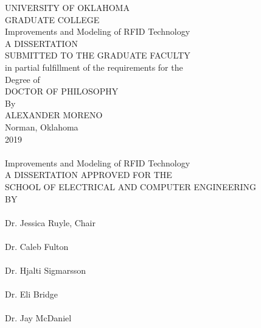 \documentclass[12pt,onecolumn]{report}
\begin{document}
\centering
UNIVERSITY OF OKLAHOMA \\
GRADUATE COLLEGE \\
\vspace{5\baselineskip}
Improvements and Modeling of RFID Technology \\
\vspace{4\baselineskip}
A DISSERTATION \\
SUBMITTED TO THE GRADUATE FACULTY \\
in partial fulfillment of the requirements for the \\
Degree of \\
DOCTOR OF PHILOSOPHY\\
\vspace{5\baselineskip}
By \\
ALEXANDER MORENO \\
Norman, Oklahoma \\
2019 \\

\clearpage
~ \\ \vspace{.5in}
Improvements and Modeling of RFID Technology  \\
\vspace{2\baselineskip}
A DISSERTATION APPROVED FOR THE \\
SCHOOL OF ELECTRICAL AND COMPUTER ENGINEERING \\
\vspace{5\baselineskip}
BY \\
\vspace{6\baselineskip}
\raggedleft
\hspace*{3in}\hrulefill \\
Dr. Jessica Ruyle, Chair \\
\vspace{3\baselineskip}
\hspace*{3in}\hrulefill \\
Dr. Caleb Fulton \\
\vspace{3\baselineskip}
\hspace*{3in}\hrulefill \\
Dr. Hjalti Sigmarsson \\
\vspace{3\baselineskip}
\hspace*{3in}\hrulefill \\
Dr. Eli Bridge \\
\vspace{3\baselineskip}
\hspace*{3in}\hrulefill \\
Dr. Jay McDaniel\\
\end{document}
